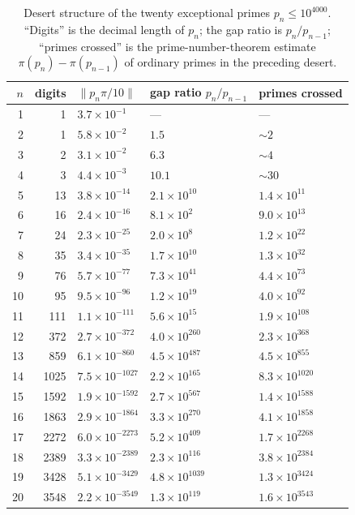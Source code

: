 \documentclass[11pt,letterpaper]{article}
\theoremstyle{definition}
\begin{document}
\begin{table}[ht]
\centering
\caption{Desert structure of the twenty exceptional primes $p_n\le 10^{4000}$.
``Digits'' is the decimal length of $p_n$; the gap ratio is $p_n/p_{n-1}$;
``primes crossed'' is the prime-number-theorem estimate
$\pi(p_n)-\pi(p_{n-1})$ of ordinary primes in the preceding desert.}
\label{tab:desert}
\begin{tabular}{rrlll@{}}
\hline
$n$ & digits & $\|p_n\pi/10\|$ & gap ratio $p_n/p_{n-1}$ & primes crossed \\
\hline
1  & 1    & $3.7\times10^{-1}$    & ---                    & ---                    \\
2  & 1    & $5.8\times10^{-2}$    & $1.5$                  & $\sim 2$               \\
3  & 2    & $3.1\times10^{-2}$    & $6.3$                  & $\sim 4$               \\
4  & 3    & $4.4\times10^{-3}$    & $10.1$                 & $\sim 30$              \\
5  & 13   & $3.8\times10^{-14}$   & $2.1\times10^{10}$     & $1.4\times10^{11}$     \\
6  & 16   & $2.4\times10^{-16}$   & $8.1\times10^{2}$      & $9.0\times10^{13}$     \\
7  & 24   & $2.3\times10^{-25}$   & $2.0\times10^{8}$      & $1.2\times10^{22}$     \\
8  & 35   & $3.4\times10^{-35}$   & $1.7\times10^{10}$     & $1.3\times10^{32}$     \\
9  & 76   & $5.7\times10^{-77}$   & $7.3\times10^{41}$     & $4.4\times10^{73}$     \\
10 & 95   & $9.5\times10^{-96}$   & $1.2\times10^{19}$     & $4.0\times10^{92}$     \\
11 & 111  & $1.1\times10^{-111}$  & $5.6\times10^{15}$     & $1.9\times10^{108}$    \\
12 & 372  & $2.7\times10^{-372}$  & $4.0\times10^{260}$    & $2.3\times10^{368}$    \\
13 & 859  & $6.1\times10^{-860}$  & $4.5\times10^{487}$    & $4.5\times10^{855}$    \\
14 & 1025 & $7.5\times10^{-1027}$ & $2.2\times10^{165}$    & $8.3\times10^{1020}$   \\
15 & 1592 & $1.9\times10^{-1592}$ & $2.7\times10^{567}$    & $1.4\times10^{1588}$   \\
16 & 1863 & $2.9\times10^{-1864}$ & $3.3\times10^{270}$    & $4.1\times10^{1858}$   \\
17 & 2272 & $6.0\times10^{-2273}$ & $5.2\times10^{409}$    & $1.7\times10^{2268}$   \\
18 & 2389 & $3.3\times10^{-2389}$ & $2.3\times10^{116}$    & $3.8\times10^{2384}$   \\
19 & 3428 & $5.1\times10^{-3429}$ & $4.8\times10^{1039}$   & $1.3\times10^{3424}$   \\
20 & 3548 & $2.2\times10^{-3549}$ & $1.3\times10^{119}$    & $1.6\times10^{3543}$   \\
\hline
\end{tabular}
\end{table}
\end{document}
